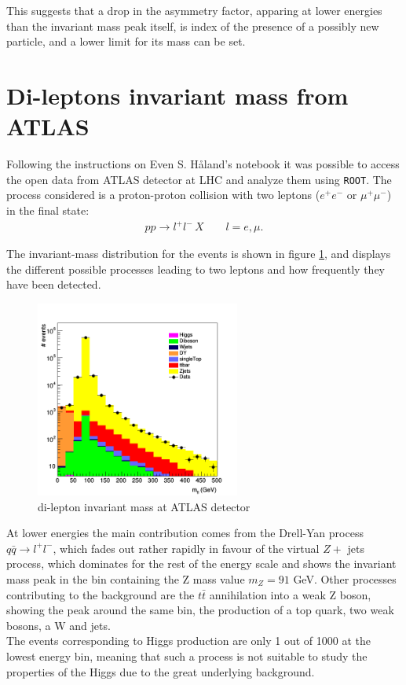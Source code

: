 \documentclass[12pt,letterpaper]{article}
\begin{document}
This suggests that a drop in the asymmetry factor, apparing at lower energies than the invariant mass peak itself, is index of the presence of a possibly new particle, and a lower limit for its mass can be set.




\section{Di-leptons invariant mass from ATLAS}

Following the instructions on Even S. H\aa land's notebook \cite{even} it was possible to access the open data from ATLAS detector at LHC and analyze them using \texttt{ROOT}. 
The process considered is a proton-proton collision with two leptons ($e^+e^-$ or $\mu^+\mu^-$) in the final state:
\begin{align*}
pp \rightarrow l^+l^-\,X\qquad l=e,\mu.
\end{align*}

The invariant-mass distribution for the events is shown in figure \ref{atlas}, and displays the different possible processes leading to two leptons and how frequently they have been detected.

\begin{figure}[!ht]
\centering
\includegraphics[width=0.6\textwidth]{figures/atlas.jpeg}
\caption{di-lepton invariant mass at ATLAS detector}
\label{atlas}
\end{figure}

At lower energies the main contribution comes from the Drell-Yan process $q\bar{q}\rightarrow l^+l^-$, which fades out rather rapidly in favour of the virtual $Z +$ jets process, which dominates for the rest of the energy scale and shows the invariant mass peak in the bin containing the Z mass value $m_Z = 91$ GeV. Other processes contributing to the background are the $t\bar{t}$ annihilation into a weak Z boson, showing the peak around the same bin, the production of a top quark, two weak bosons, a W and jets. \\
The events corresponding to Higgs production are only 1 out of 1000 at the lowest energy bin, meaning that such a process is not suitable to study the properties of the Higgs due to the great underlying background. 


\end{document}
